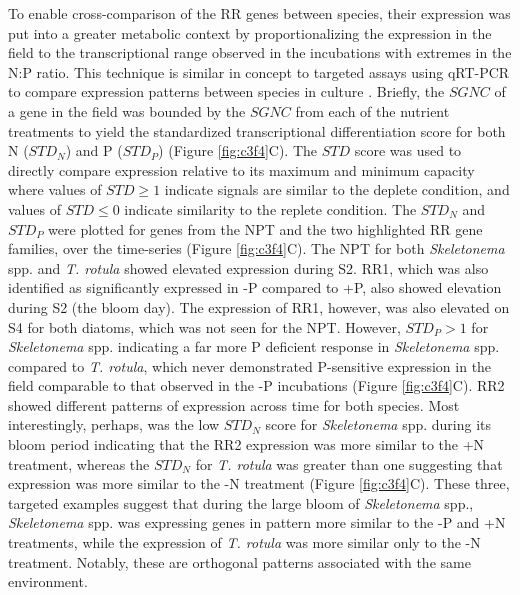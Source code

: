 To enable cross-comparison of the RR genes between species, their expression was put into a greater metabolic context by proportionalizing the expression in the field to the transcriptional range observed in the incubations with extremes in the N:P ratio. This technique is similar in concept to targeted assays using qRT-PCR to compare expression patterns between species in culture \citep{Kang2009}. Briefly, the $SGNC$ of a gene in the field was bounded by the $SGNC$ from each of the nutrient treatments to yield the standardized transcriptional differentiation score for both N ($STD_N$) and P ($STD_P$) (Figure \ref{fig:c3f4}C). The $STD$ score was used to directly compare expression relative to its maximum and minimum capacity where values of $STD \geq 1$ indicate signals are similar to the deplete condition, and values of $STD \leq 0$ indicate similarity to the replete condition. The $STD_N$ and $STD_P$ were plotted for genes from the NPT and the two highlighted RR gene families, over the time-series (Figure \ref{fig:c3f4}C). The NPT for both \textit{Skeletonema} spp. and \textit{T. rotula} showed elevated expression during S2. RR1, which was also identified as significantly expressed in -P compared to +P, also showed elevation during S2 (the bloom day). The expression of RR1, however, was also elevated on S4 for both diatoms, which was not seen for the NPT. However, $STD_P >1$ for \textit{Skeletonema} spp. indicating a far more P deficient response in \textit{Skeletonema} spp. compared to \textit{T. rotula}, which never demonstrated P-sensitive expression in the field comparable to that observed in the -P incubations (Figure \ref{fig:c3f4}C). RR2 showed different patterns of expression across time for both species. Most interestingly, perhaps, was the low $STD_N$ score for \textit{Skeletonema} spp. during its bloom period indicating that the RR2 expression was more similar to the +N treatment, whereas the $STD_N$ for \textit{T. rotula} was greater than one suggesting that expression was more similar to the -N treatment (Figure \ref{fig:c3f4}C). These three, targeted examples suggest that during the large bloom of \textit{Skeletonema} spp., \textit{Skeletonema} spp. was expressing genes in pattern more similar to the -P and +N treatments, while the expression of \textit{T. rotula} was more similar only to the -N treatment. Notably, these are orthogonal patterns associated with the same environment. \par
